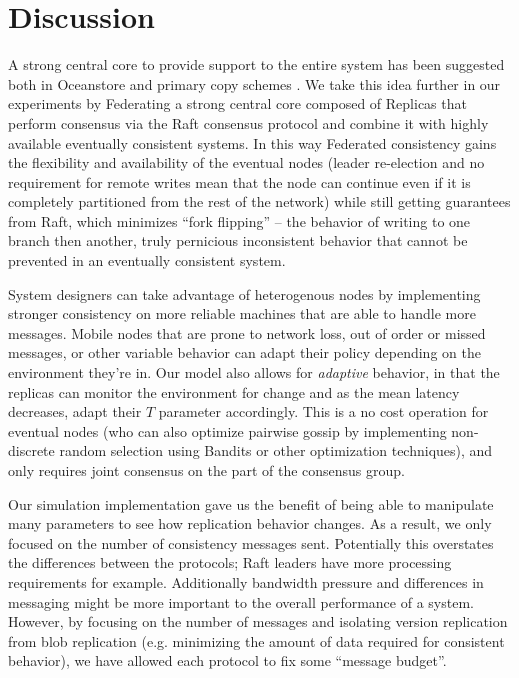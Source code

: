 \documentclass[10pt,conference,compsocconf,letterpaper]{IEEEtran}
\begin{document}
\section{Discussion}

A strong central core to provide support to the entire system has been suggested both in Oceanstore \cite{kubiatowicz_oceanstore:_2000} and primary copy schemes \cite{gray_dangers_1996}. We take this idea further in our experiments by Federating a strong central core composed of Replicas that perform consensus via the Raft consensus protocol and combine it with highly available eventually consistent systems. In this way Federated consistency gains the flexibility and availability of the eventual nodes (leader re-election and no requirement for remote writes mean that the node can continue even if it is completely partitioned from the rest of the network) while still getting guarantees from Raft, which minimizes ``fork flipping'' -- the behavior of writing to one branch then another, truly pernicious inconsistent behavior that cannot be prevented in an eventually consistent system.

System designers can take advantage of heterogenous nodes by implementing stronger consistency on more reliable machines that are able to handle more messages. Mobile nodes that are prone to network loss, out of order or missed messages, or other variable behavior can adapt their policy depending on the environment they're in. Our model also allows for \textit{adaptive} behavior, in that the replicas can monitor the environment for change and as the mean latency decreases, adapt their $T$ parameter accordingly. This is a no cost operation for eventual nodes (who can also optimize pairwise gossip by implementing non-discrete random selection using Bandits or other optimization techniques), and only requires joint consensus on the part of the consensus group.

Our simulation implementation gave us the benefit of being able to manipulate many parameters to see how replication behavior changes. As a result, we only focused on the number of consistency messages sent. Potentially this overstates the differences between the protocols; Raft leaders have more processing requirements for example. Additionally bandwidth pressure and differences in messaging might be more important to the overall performance of a system. However, by focusing on the number of messages and isolating version replication from blob replication (e.g. minimizing the amount of data required for consistent behavior), we have allowed each protocol to fix some ``message budget''.
\end{document}
